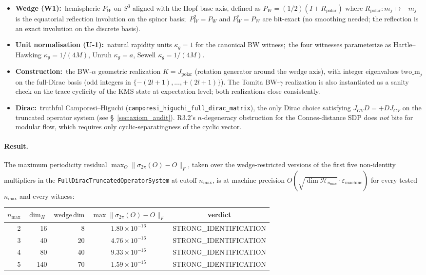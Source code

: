 \documentclass[11pt]{article}
\begin{document}
\begin{itemize}
\item \textbf{Wedge (W1):}\ hemispheric $P_W$ on $S^3$ aligned with
the Hopf-base axis, defined as $P_W = (1/2)(I + R_{\mathrm{polar}})$
where $R_{\mathrm{polar}}: m_j \mapsto -m_j$ is the equatorial
reflection involution on the spinor basis;\ $P_W^2 = P_W$ and
$P_W^* = P_W$ are bit-exact (no smoothing needed; the reflection is
an exact involution on the discrete basis).
\item \textbf{Unit normalisation (U-1):}\ natural rapidity units
$\kappa_g = 1$ for the canonical BW witness;\ the four witnesses
parameterize as Hartle--Hawking $\kappa_g = 1/(4M)$, Unruh
$\kappa_g = a$, Sewell $\kappa_g = 1/(4M)$.
\item \textbf{Construction:}\ the BW-$\alpha$ geometric realization
$K = J_{\mathrm{polar}}$ (rotation generator around the wedge axis),
with integer eigenvalues $\mathrm{two\_m}_j$ on the full-Dirac basis
(odd integers in $\{-(2l+1), \ldots, +(2l+1)\}$).  The Tomita BW-$\gamma$
realization is also instantiated as a sanity check on the trace
cyclicity of the KMS state at expectation level; both realizations
close consistently.
\item \textbf{Dirac:}\ truthful Camporesi--Higuchi
(\verb|camporesi_higuchi_full_dirac_matrix|), the only Dirac choice
satisfying $J_{GV} D = +D J_{GV}$ on the truncated operator system
(see \S~\ref{sec:axiom_audit}).  R3.2's $n$-degeneracy obstruction for
the Connes-distance SDP does \emph{not} bite for modular flow, which
requires only cyclic-separatingness of the cyclic vector.
\end{itemize}

\paragraph{Result.}
The maximum periodicity residual
$\max_O \|\sigma_{2\pi}(O) - O\|_F$, taken over the wedge-restricted
versions of the first five non-identity multipliers in the
\verb|FullDiracTruncatedOperatorSystem| at cutoff $n_{\max}$, is at
machine precision $O(\sqrt{\dim \mathcal{H}_{n_{\max}}} \cdot
\varepsilon_{\mathrm{machine}})$ for every tested $n_{\max}$ and every
witness:

\begin{center}
\begin{tabular}{rrrcc}
\toprule
$n_{\max}$ & $\dim_H$ & $\mathrm{wedge\,dim}$ & $\max\|\sigma_{2\pi}(O) - O\|_F$ & verdict\\
\midrule
2 & 16 & 8 & $1.80 \times 10^{-16}$ & STRONG\_IDENTIFICATION\\
3 & 40 & 20 & $4.76 \times 10^{-16}$ & STRONG\_IDENTIFICATION\\
4 & 80 & 40 & $9.33 \times 10^{-16}$ & STRONG\_IDENTIFICATION\\
5 & 140 & 70 & $1.59 \times 10^{-15}$ & STRONG\_IDENTIFICATION\\
\bottomrule
\end{tabular}
\end{center}
\end{document}
